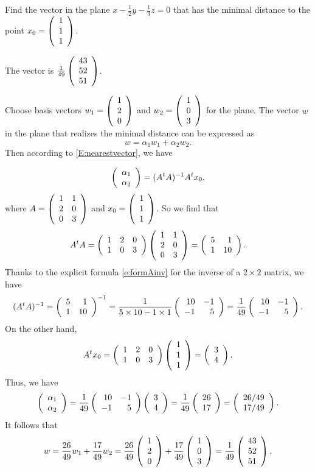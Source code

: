 \documentclass{ximera}
\begin{document}
\begin{exercise} \label{YZ_9.1.4}
Find the vector in the plane $x-\frac12 y-\frac13 z=0$ that has the minimal distance to the point $x_0=\Matrix{1\\1\\1}$.

\begin{solution}

\ans The vector is $\frac{1}{49}\Matrix{43\\52\\51}$.

\soln Choose basis vectors $w_1=\Matrix{1\\2\\0}$ and $w_2=\Matrix{1\\0\\3}$ for the plane. The vector 
$w$ in the plane that realizes the minimal distance can be expressed as 
\[
w=\alpha_1w_1+\alpha_2w_2.
\]
Then according to \eqref{E:nearestvector}, we have

\[
\Matrix{\alpha_1\\\alpha_2}=(A^tA)^{-1}A^tx_0,
\]
where $A=\Matrix{1&1\\2&0\\0&3}$ and $x_0=\Matrix{1\\1\\1}$. So we find that 
\[
A^tA=\Matrix{1 & 2&0\\1&0&3}\Matrix{1&1\\2&0\\0&3}=\Matrix{5&1\\1&10}.
\]
Thanks to the explicit formula \eqref{e:formAinv} for the inverse of a $2\times 2$ matrix, we have
\[
(A^tA)^{-1}=\Matrix{5&1\\1&10}^{-1}=\frac{1}{5\times 10-1\times 1}\Matrix{ 10 & -1\\-1& 5}=\frac{1}{49}\Matrix{10& -1\\-1& 5}.
\]
On the other hand, 
\[
A^tx_0=\Matrix{1 & 2&0\\1&0&3}\Matrix{1\\1\\1}=\Matrix{3\\4}. 
\]
Thus, we have 
\[
\Matrix{\alpha_1\\\alpha_2}=\frac{1}{49}\Matrix{10& -1\\-1& 5}\Matrix{3\\4}=\frac{1}{49}\Matrix{26\\17}=\Matrix{26/49\\17/49}.
\]
It follows that 
\[
w=\frac{26}{49}w_1+\frac{17}{49}w_2=\frac{26}{49}\Matrix{1\\2\\0}+\frac{17}{49}\Matrix{1\\0\\3}=\frac{1}{49}\Matrix{43\\52\\51}.
\]
\end{solution}
\end{exercise}
\end{document}
